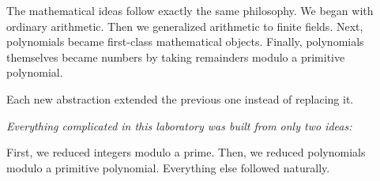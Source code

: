 The mathematical ideas follow exactly the same philosophy. We began with ordinary arithmetic. Then we generalized arithmetic to finite fields. Next, polynomials became first-class mathematical objects. Finally, polynomials themselves became numbers by taking remainders modulo a primitive polynomial.

Each new abstraction extended the previous one instead of replacing it.

\begin{center}
\Large
\emph{Everything complicated in this laboratory was built from only two ideas:}

\vspace{0.5cm}
\end{center}

First, we reduced integers modulo a prime. Then, we reduced polynomials modulo a primitive polynomial. Everything else followed naturally.
